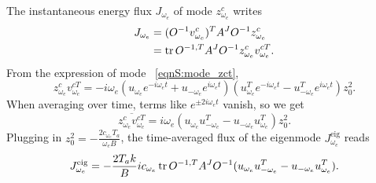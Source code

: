 \documentclass[
 amsmath,amssymb,
 aps,
 pre,
 longbibliography,
 10pt, onecolumn,
 notitlepage
]{revtex4-1}
\begin{document}
The instantaneous energy flux $J_{\omega_e}$ of mode $z^c_{\omega_e}$ writes
\begin{equation}
\begin{split}
J_{\omega_e} &= (O^{-1} v^{c}_{\omega_e})^T A^J O^{-1}z^c_{\omega_e} \\
&= \tr O^{-1,T} A^J O^{-1}z^c_{\omega_e} v^{cT}_{\omega_e} .
\end{split}
\end{equation}
From the expression of mode \eqnname~\eqref{eqnS:mode_zct},
\begin{equation}
z^c_{\omega_e} v^{cT}_{\omega_e} = -i\omega_e(u_{\omega_e} e^{-i\omega_e t} + u_{-\omega_e}e^{i\omega_e t})(u_{\omega_e}^T e^{-i\omega_e t} - u_{-\omega_e}^Te^{i\omega_e t})z_0^2 .
\end{equation}
When averaging over time, terms like $e^{\pm 2i\omega_e t}$ vanish, so we get
\begin{equation}
\overline{z^c_{\omega_e} v^{cT}_{\omega_e}} = i\omega_e(u_{\omega_e} u_{-\omega_e}^T - u_{-\omega_e} u_{\omega_e}^T)z_0^2 .
\end{equation}
Plugging in $z_0^2 = -\frac{2c_{\omega_e} T_a}{\omega_e B}$, the time-averaged flux of the eigenmode $J_{\omega_e}^\text{eig}$ reads
\begin{equation} \label{eqnS:mode_J_isolated}
J_{\omega_e}^\text{eig} = -\frac{2T_ak}{B} ic_{\omega_e} \tr O^{-1,T}A^JO^{-1} (u_{\omega_e} u_{-\omega_e}^T - u_{-\omega_e} u_{\omega_e}^T) .
\end{equation}
\end{document}
